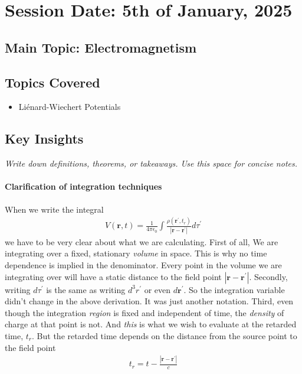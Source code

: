 \section{Session Date: 5th of January, 2025}
\subsection*{Main Topic: Electromagnetism}
\subsection*{Topics Covered}
\begin{itemize}
    \item Liénard-Wiechert Potentials
\end{itemize}

\subsection*{Key Insights}
\textit{Write down definitions, theorems, or takeaways. Use this space for concise notes.}
\paragraph{Clarification of integration techniques} When we write the integral \begin{align*}
    V(\mathbf{r}, t) = \frac{1}{4\pi\epsilon_0} \int \frac{\rho (\mathbf{r}^{\prime}, t_r)}{\left| \mathbf{r} - \mathbf{r}^{\prime}  \right| } d \tau ^{\prime} 
\end{align*}
we have to be very clear about what we are calculating. First of all, We are integrating over a fixed, stationary \textit{volume} in space. This is why no time dependence is implied in the denominator. Every point in the volume we are integrating over will have a static distance to the field point \(\left| \mathbf{r} - \mathbf{r}^{\prime} \right| \). Secondly, writing \(d \tau ^{\prime} \) is the same as writing \(d^3 r^{\prime} \) or even \(d \mathbf{r}^{\prime} \). So the integration variable didn't change in the above derivation. It was just another notation. Third, even though the integration \textit{region} is fixed and independent of time, the \textit{density} of charge at that point is not. And \emph{this} is what we wish to evaluate at the retarded time, \(t_r\). But the retarded time depends on the distance from the source point to the field point \begin{align*}
    t_r = t - \frac{\left| \mathbf{r} - \mathbf{r}^{\prime}\right| }{c}
\end{align*} 

